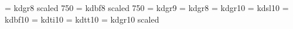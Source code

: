 %
%
%
% 
% 
%
\let\@prtct=\relax

\def\@addfontinfo#1#2{{\def\@prtct{\noexpand\@prtct\noexpand}\def\def{\noexpand
    \def\noexpand}\xdef#1{#1#2}}}

\def\@getfont#1#2#3#4{\@ifundefined{\string #1\string #3}{\global\expandafter
    \font \csname \string #1\string #3\endcsname #4\relax
     \@addfontinfo#3{\textfont #2\csname \string #1\string #3\endcsname
     \scriptfont #2\csname \string #1\string #3\endcsname
     \scriptscriptfont #2\csname \string #1\string #3\endcsname
     \def#1{\fam #2\csname\string #1\string #3\endcsname}}}{}#3#1}


\def\normalsize{\ifx\@currsize\normalsize\ifnum\language=\greek\else\rm\fi %
 \else \@normalsize\fi}

%
%
\font\sixgr   = kdgr8 scaled 750 	%
\font\sixgrbf = kdbf8 scaled 750	%
\font\ningr   = kdgr9              	%
\font\eiggr   = kdgr8             	%
\font\tengr   = kdgr10              	%
\font\tengrsl = kdsl10            	%
\font\tengrbf = kdbf10            	%
\font\tengri  = kdti10             	%
\font\tengrtt = kdtt10            	%
\font\twlgr   = kdgr10 scaled	%
%
%
\def\gr{\protect\pgr}
\def\grbf{\protect\pgrbf}
\def\grit{\protect\pgrit}
\def\grtt{\protect\pgrtt}
\def\grsl{\protect\pgrsl}
%
\def\gr@@k{kdgr10}
\def\gr@@kb{kdbf10}
\def\gr@@ki{kdti10}
\def\gr@@kt{kdtt10}
\def\gr@@ks{kdsl10}
\def\@eiggr{kdgr8}
\def\@ningr{kdgr9}
\def\@eiggrbf{kdbf8}
\def\@ningrbf{kdbf9}
%
%
%
\newfam\grfam		%
\newfam\grbfam		%
\newfam\grifam		%
\newfam\grttfam		%
\newfam\grsfam		%


